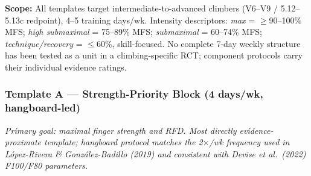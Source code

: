 \noindent\textbf{Scope:} All templates target intermediate-to-advanced climbers (V6–V9 / 5.12–5.13c redpoint), 4–5 training days/wk. Intensity descriptors: \textit{max} = $\geq$90–100\% MFS; \textit{high submaximal} = 75–89\% MFS; \textit{submaximal} = 60–74\% MFS; \textit{technique/recovery} = $\leq$60\%, skill-focused. No complete 7-day weekly structure has been tested as a unit in a climbing-specific RCT; component protocols carry their individual evidence ratings.

\subsubsection*{Template A — Strength-Priority Block (4 days/wk, hangboard-led)}

\noindent\textit{Primary goal: maximal finger strength and RFD. Most directly evidence-proximate template; hangboard protocol matches the 2$\times$/wk frequency used in López-Rivera \& González-Badillo (2019) and consistent with Devise et al.\ (2022) F100/F80 parameters.}

